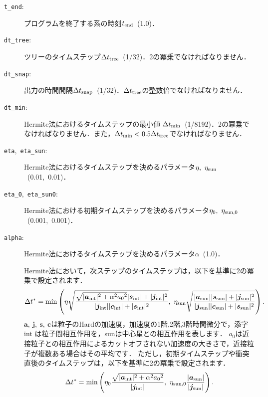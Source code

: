 \documentclass[12pt,a4paper,dvipdfmx]{jsarticle}
\begin{document}
\begin{description}
\item[\texttt{t\_end}:]
プログラムを終了する系の時刻$t_{\rm end}$\ (1.0)．
\item[\texttt{dt\_tree}:]
ツリーのタイムステップ$\Delta t_{\rm tree}$\ (1/32)．2の冪乗でなければなりません．
\item[\texttt{dt\_snap}:]
出力の時間間隔$\Delta t_{\rm snap}$\ (1/32)．$\Delta t_{\rm tree}$の整数倍でなければなりません．
\item[\texttt{dt\_min}:]
Hermite法におけるタイムステップの最小値$\ \Delta t_{\rm min}$\ (1/8192)．2の冪乗でなければなりません．また，$\Delta t_{\rm min}<0.5\Delta t_{\rm tree}$でなければなりません．
\item[\texttt{eta},\ \texttt{eta\_sun}:]
Hermite法におけるタイムステップを決めるパラメータ$\eta,\ \eta_{\rm sun}$\ (0.01,\ 0.01)．
\item[\texttt{eta\_0},\ \texttt{eta\_sun0}:]
Hermite法における初期タイムステップを決めるパラメータ$\eta_{0},\ \eta_{\rm sun, 0}$\ (0.001,\ 0.001)．
\item[\texttt{alpha}:]
Hermite法におけるタイムステップを決めるパラメータ$\alpha$\ (1.0)．

Hermite法において，次ステップのタイムステップは，以下を基準に2の冪乗で設定されます．
\begin{equation}
\Delta t^{*} = \min\left(
\eta\sqrt{\frac{\sqrt{|\bm{a}_{\rm int}|^{2}+\alpha^{2}{a_{0}}^{2}}|\bm{s}_{\rm int}|+|\bm{j}_{\rm int}|^{2}}{|\bm{j}_{\rm int}||\bm{c}_{\rm int}|+|\bm{s}_{\rm int}|^{2}}},\ 
\eta_{\rm sun}\sqrt{\frac{|\bm{a}_{\rm sun}||\bm{s}_{\rm sun}|+|\bm{j}_{\rm sun}|^{2}}{|\bm{j}_{\rm sun}||\bm{c}_{\rm sun}|+|\bm{s}_{\rm sun}|^{2}}}
\right).
\end{equation}
$\bm{a},\ \bm{j},\ \bm{s},\ \bm{c}$は粒子のHardの加速度，加速度の1階,2階,3階時間微分で，添字 int は粒子間相互作用を，sunは中心星との相互作用を表します．
$a_{0}$は近接粒子との相互作用によるカットオフされない加速度の大きさで，近接粒子が複数ある場合はその平均です．
ただし，初期タイムステップや衝突直後のタイムステップは，以下を基準に2の冪乗で設定されます．
\begin{equation}
\Delta t^{*} = \min\left(
\eta_{0}\frac{\sqrt{|\bm{a}_{\rm int}|^{2}+\alpha^{2}{a_{0}}^{2}}}{|\bm{j}_{\rm int}|},\ 
\eta_{\rm sun, 0}\frac{|\bm{a}_{\rm sun}|}{|\bm{j}_{\rm sun}|}
\right).
\end{equation}


\end{description}
\end{document}
